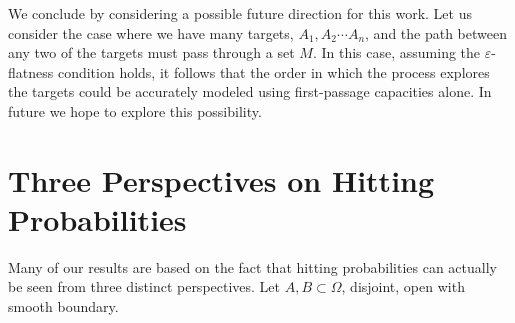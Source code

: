\documentclass[12pt, nofootinbib,english, amsmath, amssymb, aps, priprint, graphicx,floatfix]{revtex4-1}
\theoremstyle{plain}
\theoremstyle{definition}
\theoremstyle{plain}
\begin{document}
We conclude by considering a possible future direction for this work.  Let us consider the case where we have many targets, $A_1,A_2\cdots A_n$, and the path between any two of the targets must pass through a set $M$.  In this case, assuming the $\varepsilon$-flatness condition holds, it follows that the order in which the process explores the targets could be accurately modeled using first-passage capacities alone.  In future we hope to explore this possibility.

\newpage
\appendix
{}


                                                         
\section{Three Perspectives on Hitting Probabilities}
\label{sec:three_perspectives}

Many of our results are based on the fact that hitting probabilities can actually be seen from three distinct perspectives.  Let $A,B\subset \Omega$, disjoint, open with smooth boundary.  
\end{document}
